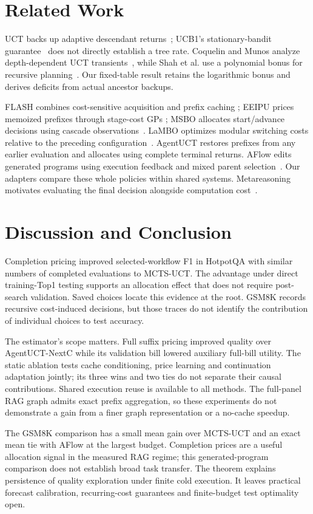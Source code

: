 \section{Related Work}
UCT backs up adaptive descendant returns~\citep{kocsis2006bandit}; UCB1's
stationary-bandit guarantee~\citep{auer2002finite} does not directly establish
a tree rate. Coquelin and Munos analyze depth-dependent UCT
transients~\citep{coquelin2007bandit}, while Shah et al. use a polynomial bonus
for recursive planning~\citep{shah2020mcts}. Our fixed-table result retains
the logarithmic bonus and derives deficits from actual ancestor backups.

FLASH combines cost-sensitive acquisition and prefix caching
\citep{zhang2016flash}; EEIPU prices memoized prefixes through stage-cost GPs
\citep{essofi2024memoization}; MSBO allocates start/advance decisions using
cascade observations~\citep{torresi2026multistage}. LaMBO optimizes modular
switching costs relative to the preceding configuration~\citep{lin2021lambo}.
AgentUCT restores prefixes from any earlier evaluation and allocates using
complete terminal returns. AFlow edits generated programs using execution
feedback and mixed parent selection~\citep{zhang2024aflow}. Our adapters
compare these whole policies within shared systems. Metareasoning motivates
evaluating the final decision alongside computation cost~\citep{hay2012selecting}.

\section{Discussion and Conclusion}
Completion pricing improved selected-workflow F1 in HotpotQA with similar
numbers of completed evaluations to MCTS-UCT. The advantage under direct
training-Top1 testing supports an allocation effect that does not require
post-search validation. Saved choices locate this evidence at the root.
GSM8K records recursive cost-induced decisions, but those traces do not
identify the contribution of individual choices to test accuracy.

The estimator's scope matters. Full suffix pricing improved quality over
AgentUCT-NextC while its validation bill lowered auxiliary full-bill utility.
The static ablation tests cache conditioning, price learning and continuation
adaptation jointly; its three wins and two ties do not separate their causal
contributions. Shared execution reuse is available to all methods. The
full-panel RAG graph admits exact prefix aggregation, so these experiments
do not demonstrate a gain from a finer graph representation or a no-cache
speedup.

The GSM8K comparison has a small mean gain over MCTS-UCT and an exact
mean tie with AFlow at the largest budget. Completion prices are a useful
allocation signal in the measured RAG regime; this generated-program
comparison does not establish broad task transfer. The theorem explains persistence of quality exploration
under finite cold execution. It leaves practical forecast calibration,
recurring-cost guarantees and finite-budget test optimality open.
